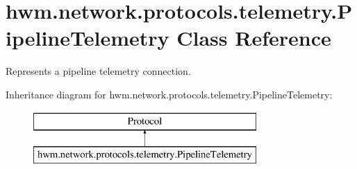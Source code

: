 \hypertarget{classhwm_1_1network_1_1protocols_1_1telemetry_1_1_pipeline_telemetry}{\section{hwm.\-network.\-protocols.\-telemetry.\-Pipeline\-Telemetry Class Reference}
\label{classhwm_1_1network_1_1protocols_1_1telemetry_1_1_pipeline_telemetry}
}


Represents a pipeline telemetry connection.  


Inheritance diagram for hwm.\-network.\-protocols.\-telemetry.\-Pipeline\-Telemetry\-:\begin{figure}[H]
\begin{center}
\leavevmode
\includegraphics[height=2.000000cm]{classhwm_1_1network_1_1protocols_1_1telemetry_1_1_pipeline_telemetry}
\end{center}
\end{figure}
